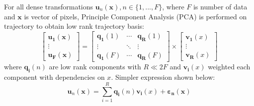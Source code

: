 For all dense transformations $\bm{u}_n(\bm{x}), n \in \{1,...,F\}$, where $F$ is number of data and $\bm{x}$ is vector of pixels, Principle Component Analysis (PCA) is performed on trajectory to obtain low rank trajectory basis:
\begin{equation}
    \begin{bmatrix}
        \bm{u_1}(\bm{x}) \\
        \vdots \\
        \bm{u_F}(\bm{x})
    \end{bmatrix}
    =
    \begin{bmatrix}
        \bm{q_1}(1) & \cdots & \bm{q_R}(1) \\
        \vdots      & \ddots & \vdots  \\
        \bm{q_1}(F) & \cdots & \bm{q_R}(F)
    \end{bmatrix}
    \times
    \begin{bmatrix}
        \bm{v_1}(x) \\
        \vdots \\
        \bm{v_R}(x)
    \end{bmatrix}
\end{equation}
where $\bm{q_i}(n)$ are low rank components with $R \ll 2F$ and $\bm{v_i}(x)$ weighted each component with dependencies on $x$. Simpler expression shown below:
\begin{equation}
    \bm{u}_n(\bm{x})=\sum_{i=1}^R\bm{q_i}(n)\bm{v_i}(x)+\bm{\varepsilon_n}(\bm{x})
\end{equation}

